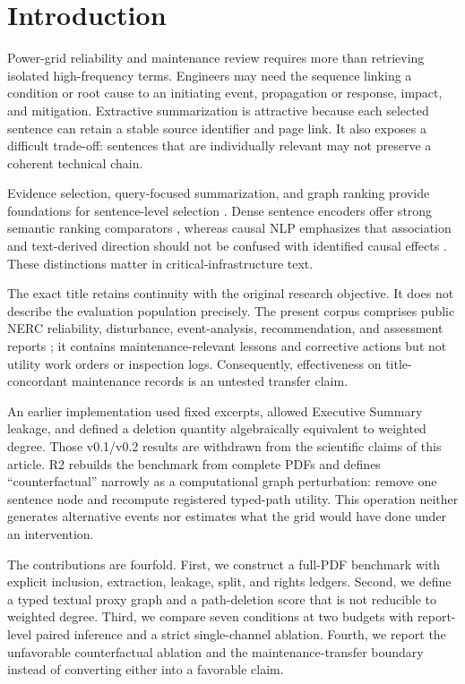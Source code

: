 \documentclass[applsci,article,submit,moreauthors]{Definitions/mdpi}
\begin{document}
\section{Introduction}

Power-grid reliability and maintenance review requires more than retrieving isolated high-frequency terms. Engineers may need the sequence linking a condition or root cause to an initiating event, propagation or response, impact, and mitigation. Extractive summarization is attractive because each selected sentence can retain a stable source identifier and page link. It also exposes a difficult trade-off: sentences that are individually relevant may not preserve a coherent technical chain.

Evidence selection, query-focused summarization, and graph ranking provide foundations for sentence-level selection \cite{thorne2018fever,zhong2021qmsum,vig2022exploring,wang2020heterogeneous}. Dense sentence encoders offer strong semantic ranking comparators \cite{reimers2019sentencebert}, whereas causal NLP emphasizes that association and text-derived direction should not be confused with identified causal effects \cite{feder2022causal,du2022ecare}. These distinctions matter in critical-infrastructure text.

The exact title retains continuity with the original research objective. It does not describe the evaluation population precisely. The present corpus comprises public NERC reliability, disturbance, event-analysis, recommendation, and assessment reports \cite{nercEventAnalysis,nerc2015qualityreport}; it contains maintenance-relevant lessons and corrective actions but not utility work orders or inspection logs. Consequently, effectiveness on title-concordant maintenance records is an untested transfer claim.

An earlier implementation used fixed excerpts, allowed Executive Summary leakage, and defined a deletion quantity algebraically equivalent to weighted degree. Those v0.1/v0.2 results are withdrawn from the scientific claims of this article. R2 rebuilds the benchmark from complete PDFs and defines ``counterfactual'' narrowly as a computational graph perturbation: remove one sentence node and recompute registered typed-path utility. This operation neither generates alternative events nor estimates what the grid would have done under an intervention.

The contributions are fourfold. First, we construct a full-PDF benchmark with explicit inclusion, extraction, leakage, split, and rights ledgers. Second, we define a typed textual proxy graph and a path-deletion score that is not reducible to weighted degree. Third, we compare seven conditions at two budgets with report-level paired inference and a strict single-channel ablation. Fourth, we report the unfavorable counterfactual ablation and the maintenance-transfer boundary instead of converting either into a favorable claim.
\end{document}
